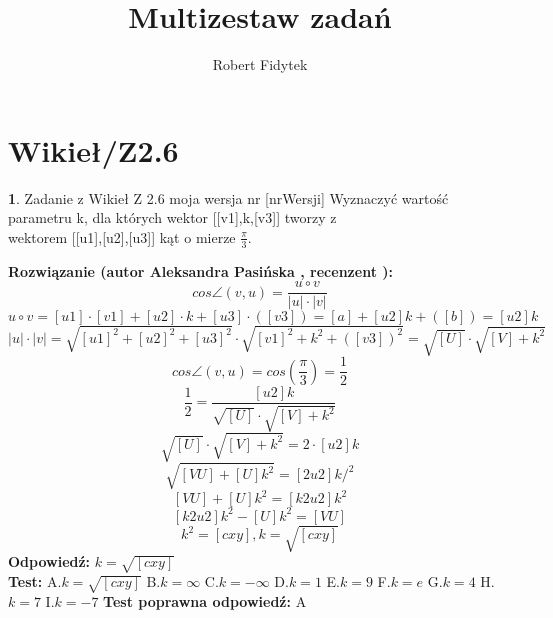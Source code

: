 \documentclass[12pt, a4paper]{article}
\title{Multizestaw zadań}
\author{Robert Fidytek}
\date{}
\theoremstyle{definition} %
\newtheorem{zad}{}
\newcommand{\kategoria}[1]{\section{#1}} %
\newcommand{\zadStart}[1]{\begin{zad}#1\newline} %
\newcommand{\zadStop}{\end{zad}}   %
\newcommand{\rozwStart}[2]{\noindent \textbf{Rozwiązanie (autor #1 , recenzent #2): }\newline} %
\newcommand{\rozwStop}{\newline}                                            %
\newcommand{\odpStart}{\noindent \textbf{Odpowiedź:}\newline}    %
\newcommand{\odpStop}{\newline}                                             %
\newcommand{\testStart}{\noindent \textbf{Test:}\newline} %
\newcommand{\testStop}{\newline} %
\newcommand{\kluczStart}{\noindent \textbf{Test poprawna odpowiedź:}\newline} %
\newcommand{\kluczStop}{\newline} %
\begin{document}
\maketitle


\kategoria{Wikieł/Z2.6}
\zadStart{Zadanie z Wikieł Z 2.6 moja wersja nr [nrWersji]}
Wyznaczyć wartość parametru k, dla których wektor [[v1],k,[v3]] tworzy z \\ wektorem [[u1],[u2],[u3]] kąt o mierze $\frac{\pi}{3}$.
\zadStop
\rozwStart{Aleksandra Pasińska}{}
$$cos\angle(v,u)=\frac{u\circ v}{|u|\cdot |v|}$$
$$u\circ v=[u1]\cdot [v1]+[u2]\cdot k+[u3]\cdot ([v3])=[a]+[u2]k+([b])=[u2]k$$
$$|u|\cdot |v|=\sqrt{[u1]^2+[u2]^2+[u3]^2}\cdot \sqrt{[v1]^2+k^2+([v3])^2}=\sqrt{[U]}\cdot\sqrt{[V]+k^2}$$
$$cos\angle(v,u)=cos(\frac{\pi}{3})=\frac{1}{2}$$
$$\frac{1}{2}=\frac{[u2]k}{\sqrt{[U]}\cdot\sqrt{[V]+k^2}}$$
$$\sqrt{[U]}\cdot\sqrt{[V]+k^2}=2\cdot[u2]k$$
$$\sqrt{[VU]+[U]k^2}=[2u2]k \bigg/^2$$
$$[VU]+[U]k^2=[k2u2]k^2$$
$$[k2u2]k^2-[U]k^2=[VU]$$
$$k^2=[cxy],k=\sqrt{[cxy]}$$
\rozwStop
\odpStart
$k=\sqrt{[cxy]}$\\
\odpStop
\testStart
A.$k=\sqrt{[cxy]}$
B.$k=\infty$
C.$k=-\infty$
D.$k=1$
E.$k=9$
F.$k=e$
G.$k=4$
H.$k=7$
I.$k=-7$
\testStop
\kluczStart
A
\kluczStop
\end{document}
